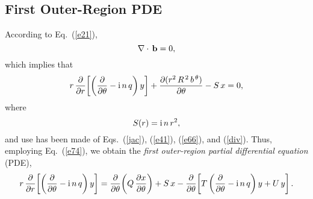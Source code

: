 \documentclass[12pt,prb,aps]{revtex4-1}
\begin{document}
\subsection{First Outer-Region PDE}
According to Eq.~(\ref{e21}), 
\begin{equation}\label{divb}
\nabla \cdot\,{\bf b} =0,
\end{equation}
which implies that
\begin{equation}
r\,\frac{\partial}{\partial r}\!\left[\left(\frac{\partial}{\partial\theta}-{\rm i}\,n\,q\right)y\right]+\frac{\partial (r^2\,R^{\,2}\,b^{\,\theta})}{\partial \theta} - S\,x=0,
\end{equation}
where
\begin{equation}\label{s}
S(r) = {\rm i}\,n\,r^2,
\end{equation}
and use has been made of Eqs.~(\ref{jac}),  (\ref{e41}),  (\ref{e66}), and (\ref{div}).
Thus, employing Eq.~(\ref{e74}), we obtain the {\em first outer-region partial differential equation}\/ (PDE), \cite{connor}
\begin{equation}\label{efirst}
r\,\frac{\partial}{\partial r}\!\left[\left(\frac{\partial}{\partial\theta}-{\rm i}\,n\,q\right)y\right]=\frac{\partial}{\partial\theta}\!\left(Q\,\frac{\partial x}{\partial\theta}\right)
+S\,x -\frac{\partial}{\partial\theta}\!\left[T\left(\frac{\partial}{\partial\theta}-{\rm i}\,n\,q\right)y+U\,y\right].
\end{equation}
\end{document}
